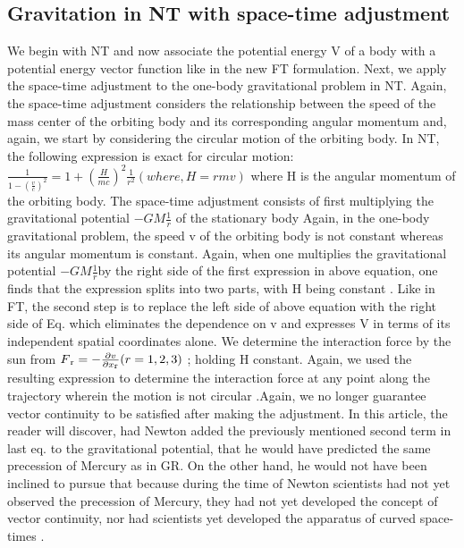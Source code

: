 \documentclass[12pt]{article}
\begin{document}
 \subsection{Gravitation in NT with space-time adjustment}
 We begin with NT and now associate the potential energy
V of a body with a potential energy vector function like in the
new FT formulation. Next, we apply the space-time adjustment to the one-body gravitational problem in NT. Again, the
space-time adjustment considers the relationship between the
speed of the mass center of the orbiting body and its corresponding angular momentum and, again, we start by considering the circular motion of the orbiting body. In NT, the
following expression is exact for circular motion: \\
$\frac{1}{1-(\frac{v}{c})^2}=1+(\frac{H}{mc})^2\frac{1}{r^2} (where,H=rmv)$
where H is the angular momentum of the orbiting body. The
space-time adjustment consists of first multiplying the gravitational potential $-GM\frac{1}{r}$ of the stationary body
Again, in the one-body gravitational problem, the
speed v of the orbiting body is not constant whereas its angular momentum is constant. Again, when one multiplies the
gravitational potential $-GM\frac{1}{r} $by the right side of the first
expression in above equation, one finds that the expression splits into
two parts, with H being constant . Like in
FT, the second step is to replace the left side of above equation with the right side of Eq.
which eliminates the dependence on
v and expresses V in terms of its independent spatial coordinates alone. We determine the interaction force by the sun
from $F\textsubscript{r} =-\frac{\partial v}{\partial x\textsubscript{r}}(r=1,2,3)$ ; holding H constant.
Again, we used the resulting expression to determine the
interaction force at any point along the trajectory wherein
the motion is not circular .Again, we no longer guarantee vector continuity to be satisfied after making the adjustment.
In this article, the reader will discover, had Newton
added the previously mentioned second term in last eq. to the
gravitational potential, that he would have predicted the
same precession of Mercury as in GR. On the other hand, he
would not have been inclined to pursue that because during
the time of Newton scientists had not yet observed the precession of Mercury, they had not yet developed the concept
of vector continuity, nor had scientists yet developed the
apparatus of curved space-times .
\end{document}
